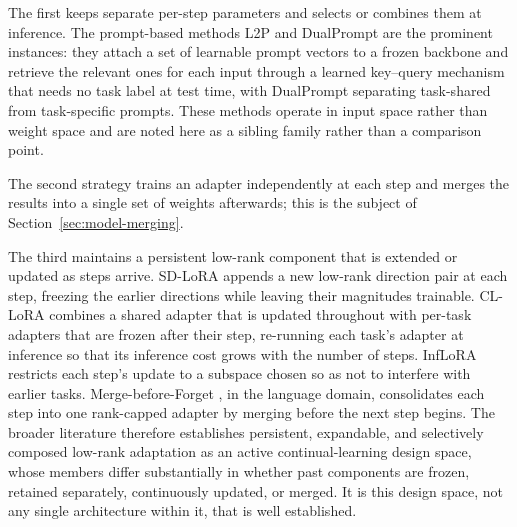 The first keeps separate per-step parameters and selects or combines them
at inference. The prompt-based methods L2P \parencite{wang2022learning} and
DualPrompt \parencite{wang2022dualprompt} are the prominent instances: they attach a
set of learnable prompt vectors to a frozen backbone and retrieve the
relevant ones for each input through a learned key--query mechanism that
needs no task label at test time, with DualPrompt separating task-shared
from task-specific prompts. These methods operate in input space rather
than weight space and are noted here as a sibling family rather than a
comparison point.

The second strategy trains an adapter independently at each step and merges
the results into a single set of weights afterwards; this is the subject of
Section~\ref{sec:model-merging}.

The third maintains a persistent low-rank component that is extended or
updated as steps arrive. SD-LoRA \parencite{wu2025sdlora} appends a new low-rank
direction pair at each step, freezing the earlier directions while leaving
their magnitudes trainable. CL-LoRA \parencite{he2025cllora} combines a shared
adapter that is updated throughout with per-task adapters that are frozen
after their step, re-running each task's adapter at inference so that its
inference cost grows with the number of steps. InfLoRA \parencite{liang2024inflora}
restricts each step's update to a subspace chosen so as not to interfere
with earlier tasks. Merge-before-Forget \parencite{qiao2025merge}, in the
language domain, consolidates each step into one rank-capped adapter by
merging before the next step begins. The broader literature therefore
establishes persistent, expandable, and selectively composed low-rank
adaptation as an active continual-learning design space, whose members
differ substantially in whether past components are frozen, retained
separately, continuously updated, or merged. It is this design space, not
any single architecture within it, that is well established.

